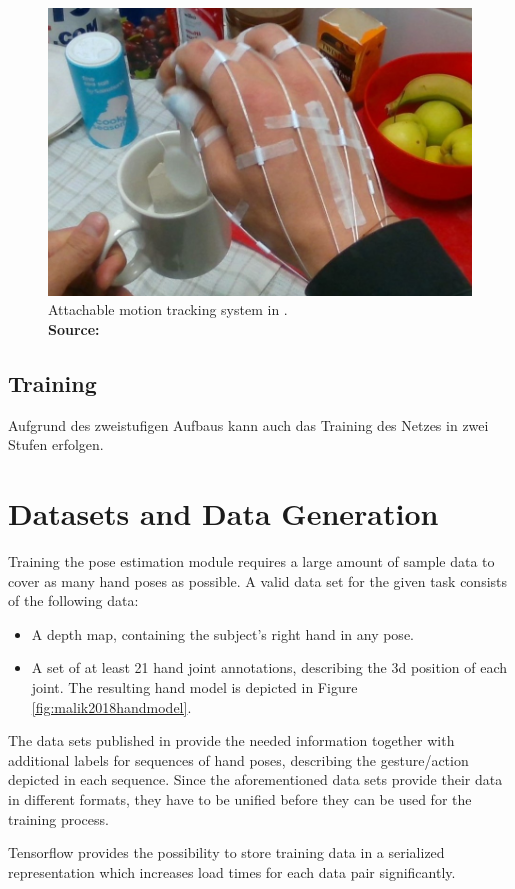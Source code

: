 \begin{figure}
	\centering
	\includegraphics[width=0.7\linewidth]{Ressourcen/garcia-rgb-problem}
	\caption[Attachable motion tracking system]{Attachable motion tracking system in \cite{GarciaHernando2017}. \\ \textbf{Source:} \cite{GarciaHernando2017}}
	\label{fig:garcia-rgb-problem}
\end{figure}

\begin{figure}
	\centering
	
	\caption{}
	\label{fig:software-net-structure-blackbox}
\end{figure}

\subsection{Training}
	Aufgrund des zweistufigen Aufbaus kann auch das Training des Netzes in zwei Stufen erfolgen.



\section{Datasets and Data Generation}
Training the pose estimation module requires a large amount of sample data to cover as many hand poses as possible. A valid data set for the given task consists of the following data:
\begin{itemize}
 \item A depth map, containing the subject's right hand in any pose. 
 \item A set of at least 21 hand joint annotations, describing the 3d position of each joint. The resulting hand model is depicted in Figure \ref{fig:malik2018handmodel}.
\end{itemize}

The data sets published in \cite{Tompson2014, Yuan2017, Sun2015, Yuan2017b, GarciaHernando2017, Yuan2017c} provide the needed information together with additional labels for sequences of hand poses, describing the gesture/action depicted in each sequence. Since the aforementioned data sets provide their data in different formats, they have to be unified before they can be used for the training process. 

Tensorflow provides the possibility to store training data in a serialized representation which increases load times for each data pair significantly. 

